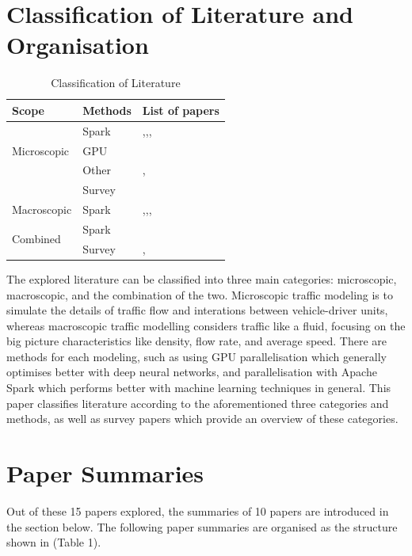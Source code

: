 \documentclass[11pt]{uonthesis}
\begin{document}
\section{Classification of Literature and Organisation} %
\begin{table}[h]
\begin{tabular}{ |p{2cm}|p{2cm}||p{3.2cm}| }
    \hline
    Scope & Methods & List of papers\\
    \hline
    \multirow{3}{3em}{Microscopic} & Spark & \cite{10.1145/2820783.2820860},\cite{yu2020dissecting},\cite{10.1007/978-981-16-4126-8_24},\cite{9077707}
    \\
    & GPU & \cite{9075295}
    \\
    & Other & \cite{8569938},\cite{10.1145/3397536.3422274} 
    \\
    & Survey & \cite{gora2020microscopic}\\
    \hline
    Macroscopic & Spark & \cite{Sigurdsson2018RoadTC},\cite{Yang2019},\cite{FAN2019298},\cite{Zhang20231124}\\
    \hline
    \multirow{2}{2em}{Combined} & Spark & \cite{STARK}
    \\
    & Survey & \cite{10356753}, \cite{LI2020225}\\
    \hline
\end{tabular}
\caption{Classification of Literature}
\end{table}

The explored literature can be classified into three main categories: microscopic, macroscopic, and the combination of the two. Microscopic traffic modeling is to simulate the details of traffic flow and interations between vehicle-driver units, whereas macroscopic traffic modelling considers traffic like a fluid, focusing on the big picture characteristics like density, flow rate, and average speed. There are methods for each modeling, such as using GPU parallelisation which generally optimises better with deep neural networks, and parallelisation with Apache Spark which performs better with machine learning techniques in general. This paper classifies literature according to the aforementioned three categories and methods, as well as survey papers which provide an overview of these categories.

\section{Paper Summaries} %
Out of these 15 papers explored, the summaries of 10 papers are introduced in the section below. The following paper summaries are organised as the structure shown in (Table 1). 
\end{document}
